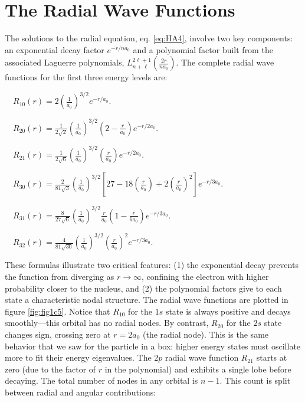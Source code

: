 \documentclass[
  english,
  9pt,
]{extbook}
\theoremstyle{definition}
\theoremstyle{definition}
\theoremstyle{definition}
\theoremstyle{definition}
\theoremstyle{remark}
\begin{document}
\section{The Radial Wave Functions}\label{the-radial-wave-functions}

The solutions to the radial equation, eq. \eqref{eq:HA4}, involve two key components: an exponential decay factor \(e^{-r/na_0}\) and a polynomial factor built from the associated Laguerre polynomials, \(L_{n+\ell}^{2\ell+1}\left( \frac{2r}{n a_0} \right)\). The complete radial wave functions for the first three energy levels are:

\(\quad R_{10}(r) = 2\left(\frac{1}{a_0}\right)^{3/2} e^{-r/a_0}.\)

\(\quad R_{20}(r) = \frac{1}{2\sqrt{2}}\left(\frac{1}{a_0}\right)^{3/2}\left(2 - \frac{r}{a_0}\right) e^{-r/2a_0}.\)

\(\quad R_{21}(r) = \frac{1}{2\sqrt{6}}\left(\frac{1}{a_0}\right)^{3/2}\left(\frac{r}{a_0}\right) e^{-r/2a_0}.\)

\(\quad R_{30}(r) = \frac{2}{81\sqrt{3}}\left(\frac{1}{a_0}\right)^{3/2}\left[27 - 18\left(\frac{r}{a_0}\right) + 2\left(\frac{r}{a_0}\right)^2\right] e^{-r/3a_0}.\)

\(\quad R_{31}(r) = \frac{8}{27\sqrt{6}}\left(\frac{1}{a_0}\right)^{3/2} \frac{r}{a_0} \left(1 - \frac{r}{6a_0}\right) e^{-r/3a_0}.\)

\(\quad R_{32}(r) = \frac{4}{81\sqrt{30}}\left(\frac{1}{a_0}\right)^{3/2} \left(\frac{r}{a_0}\right)^2 e^{-r/3a_0}.\)

These formulas illustrate two critical features: (1) the exponential decay prevents the function from diverging as \(r\rightarrow\infty\), confining the electron with higher probability closer to the nucleus, and (2) the polynomial factors give to each state a characteristic nodal structure.
The radial wave functions are plotted in figure \ref{fig:fig1c5}. Notice that \(R_{10}\) for the \(1s\) state is always positive and decays smoothly---this orbital has no radial nodes. By contrast, \(R_{20}\) for the \(2s\) state changes sign, crossing zero at \(r = 2a_0\) (the radial node). This is the same behavior that we saw for the particle in a box: higher energy states must oscillate more to fit their energy eigenvalues. The \(2p\) radial wave function \(R_{21}\) starts at zero (due to the factor of \(r\) in the polynomial) and exhibits a single lobe before decaying. The total number of nodes in any orbital is \(n - 1\). This count is split between radial and angular contributions:
\end{document}
